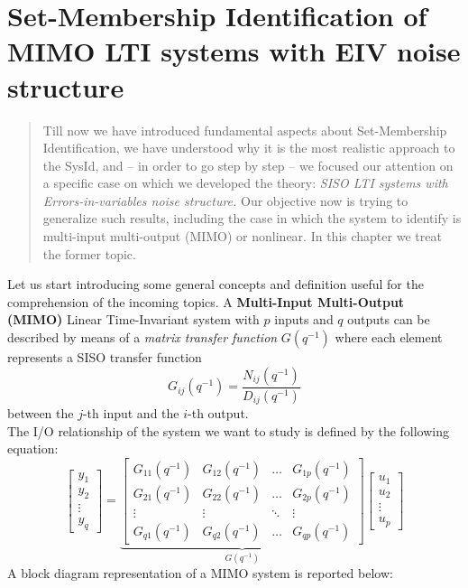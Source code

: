 \chapter[SM SysId of MIMO LTI systems with EIV noise structure]{Set-Membership Identification of MIMO LTI systems with EIV noise structure}

\begin{quotation}
    \textsf{\noindent Till now we have introduced fundamental aspects about Set-Membership Identification, we have understood why it is the most realistic approach to the SysId, and -- in order to go step by step -- we focused our attention on a specific case on which we developed the theory: \textit{SISO LTI systems with Errors-in-variables noise structure.} Our objective now is trying to generalize such results, including the case in which the system to identify is multi-input multi-output (MIMO) or nonlinear. In this chapter we treat the former topic.
    }
\end{quotation}

\noindent
Let us start introducing some general concepts and definition useful for the comprehension of the incoming topics. A \textbf{Multi-Input Multi-Output (MIMO)} Linear Time-Invariant system with $p$ inputs and $q$ outputs can be described by means of a \textit{matrix transfer function} $G(q^{-1})$ where each element represents a SISO transfer function 
\begin{equation}
    G_{ij}(q^{-1})=\frac{N_{ij}(q^{-1})}{D_{ij}(q^{-1})}
\end{equation} 
between the $j$-th input and the $i$-th output.\\
The I/O relationship of the system we want to study is defined by the following equation:
\begin{equation} \label{eq:MIMO_IO}
    \begin{bmatrix}
        y_1\\y_2\\\vdots\\y_q 
    \end{bmatrix}=\underbrace{\begin{bmatrix}
        G_{11}(q^{-1})&G_{12}(q^{-1})&\dots&G_{1p}{(q^{-1})}\\
        G_{21}(q^{-1})&G_{22}(q^{-1})&\dots&G_{2p}(q^{-1})\\
        \vdots&\vdots&\ddots&\vdots\\
        G_{q1}(q^{-1})&G_{q2}(q^{-1})&\dots&G_{qp}(q^{-1})
    \end{bmatrix}}_{G(q^{-1})}\begin{bmatrix}
        u_1\\u_2\\\vdots\\u_p
    \end{bmatrix}
\end{equation}
A block diagram representation of a MIMO system is reported below: 


